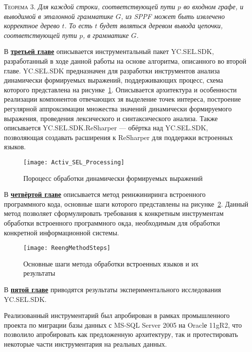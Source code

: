 \textsc{Теорема 3.} 
\textit{Для каждой строки, соответствующей пути $p$ во входном графе, и выводимой в эталонной грамматике $G$, из SPPF может быть извлечено корректное дерево $t$. То есть $t$ будет являться деревом вывода цепочки, соответствующей пути $p$, в грамматике $G$.}

\vspace{10pt}

В \underline{\textbf{третьей главе}}  описывается инструментальный пакет YC.SEL.SDK, разработанный в ходе данной работы на основе алгоритма, описанного во второй главе. YC.SEL.SDK предназначен для разработки 
инструментов анализа динамически формируемых выражений, поддерживающих процесс, схема которого представлена на рисунке~\ref{sel_processing}. Описывается архитектура и особенности реализации компонентов отвечающих зя выделение точек интереса, 
 построение регулярной аппроксимации множества значений динамически формируемого выражения, проведения лексического и синтаксического анализа. Также описывается YC.SEL.SDK.ReSharper --- обёртка над YC.SEL.SDK, позволяющая создавать расширения к ReSharper для поддержки встроенных языков.

\begin{figure}[H]
  \centering
 \texttt{[image: Activ\_SEL\_Processing]}
 \caption{Пороцесс обработки динамически формируемых выражений}
 \label{sel_processing}
\end{figure}


В \underline{\textbf{четвёртой главе}} описывается метод реинжиниринга встроенного программного кода, основные шаги которого представлены на рисунке~\ref{fig:method}. Данный метод позволяет сформулировать требования к конкретным инструментам обработки встроенного программного окда, необходимым для обработки конкретной информационной системы.

\begin{figure}[h!]
\begin{center}
\texttt{[image: ReengMethodSteps]}
\caption{Основные шаги метода обработки встроенных языков и их результаты}
\label{fig:method} 
\end{center}
\end{figure}


В \underline{\textbf{пятой главе}} приводятся результаты экспериментального исследования YC.SEL.SDK.

Реализованный инструментарий был апробирован в рамках промышленного проекта по миграции базы данных с MS-SQL Server 2005 на Oraclе 11gR2, что позволило апробировать как предложенную архитектуру, так и протестировать некоторые части инструментария на реальных данных.

